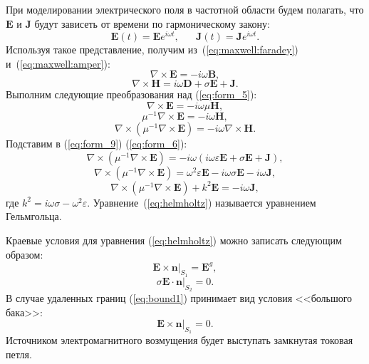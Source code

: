 \documentclass[a4paper,12pt]{article}
\begin{document}
При моделировании электрического поля в частотной области будем полагать, что $\mathbf{E}$ и $\mathbf{J}$ будут зависеть от времени по гармоническому закону:
\begin{equation*}
	\mathbf{E}(t) = \mathbf{E} e^{i \omega t} , \text{~~~~~} \mathbf{J}(t) = \mathbf{J} e^{i \omega t} .
\end{equation*}
Используя такое представление, получим из~(\ref{eq:maxwell:faradey}) и~(\ref{eq:maxwell:amper}):
\begin{equation}
	\nabla \times \mathbf{E} = - i \omega \mathbf{B} , \label{eq:form_5}
\end{equation}
\begin{equation}
	\nabla \times \mathbf{H} = i \omega \mathbf{D} + \sigma \mathbf{E} + \mathbf{J} . \label{eq:form_6}
\end{equation}
Выполним следующие преобразования над (\ref{eq:form_5}):
\begin{equation*}
	\nabla \times \mathbf{E} = - i \omega \mu \mathbf{H} ,
\end{equation*}
\begin{equation*}
	\mu^{-1} \nabla \times \mathbf{E} = - i \omega \mathbf{H} ,
\end{equation*}
\begin{equation}
	\nabla \times ( \mu^{-1} \nabla \times \mathbf{E} ) = - i \omega \nabla \times \mathbf{H} . \label{eq:form_9}
\end{equation}
Подставим в (\ref{eq:form_9}) (\ref{eq:form_6}):\nopagebreak
\begin{equation*}
	\nabla \times ( \mu^{-1} \nabla \times \mathbf{E} ) = - i \omega ( i \omega \varepsilon \mathbf{E} + \sigma \mathbf{E} + \mathbf{J} ) ,
\end{equation*}
\begin{equation*}
	\nabla \times ( \mu^{-1} \nabla \times \mathbf{E} ) = \omega^{2} \varepsilon \mathbf{E} - i \omega \sigma \mathbf{E} - i \omega \mathbf{J} ,
\end{equation*}
\begin{equation}
	\nabla \times ( \mu^{-1} \nabla \times \mathbf{E} ) + k^{2} \mathbf{E} = - i \omega \mathbf{J} , \label{eq:helmholtz}
\end{equation}
где $k^{2} = i \omega \sigma - \omega^{2} \varepsilon$. Уравнение~(\ref{eq:helmholtz}) называется уравнением Гельмгольца.

Краевые условия для уравнения (\ref{eq:helmholtz}) можно записать следующим образом:
\begin{equation}
	\left. \mathbf{E} \times \mathbf{n} \right | _{ S_1 } = {\mathbf{E}} ^g , \label{eq:bound1}
\end{equation}
\begin{equation}
	\left. \sigma \mathbf{E} \cdot \mathbf{n} \right | _{ S_2 } = 0 . \label{eq:bound2}
\end{equation}
В случае удаленных границ (\ref{eq:bound1}) принимает вид условия <<большого бака>>:
\begin{equation}
	\left. \mathbf{E} \times \mathbf{n} \right | _{ S_1 } = 0 . \label{eq:bound1_zero}
\end{equation}
Источником электромагнитного возмущения будет выступать замкнутая токовая петля.
\end{document}
